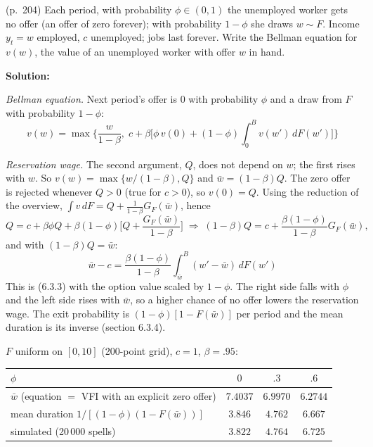\documentclass[12pt, letterpaper]{article}
\newcommand{\wb}{\bar w}
\begin{document}
\begin{tcolorbox}[oddbox,title={Exercise 6.1 \quad Being Unemployed with a Chance of an Offer}]
\begin{tcolorbox}[questionbox]
(p.~204) Each period, with probability $\phi\in(0,1)$ the unemployed worker gets no offer (an offer of
zero forever); with probability $1-\phi$ she draws $w\sim F$. Income $y_t=w$ employed, $c$ unemployed; jobs
last forever. Write the Bellman equation for $v(w)$, the value of an unemployed worker with offer $w$ in
hand.
\end{tcolorbox}

\textbf{Solution:}

\emph{Bellman equation.} Next period's offer is $0$ with probability $\phi$ and a draw from $F$ with
probability $1-\phi$:
\[
\boxed{v(w)=\max\Big\{\frac{w}{1-\beta},\;c+\beta\Big[\phi\,v(0)+(1-\phi)\int_0^Bv(w')\,dF(w')\Big]\Big\}}
\]

\emph{Reservation wage.} The second argument, $Q$, does not depend on $w$; the first rises with $w$. So
$v(w)=\max\{w/(1-\beta),Q\}$ and $\wb=(1-\beta)Q$. The zero offer is rejected whenever $Q>0$ (true for
$c>0$), so $v(0)=Q$. Using the reduction of the overview,
$\int v\,dF=Q+\frac{1}{1-\beta}G_F(\wb)$, hence
\[
Q=c+\beta\phi Q+\beta(1-\phi)\Big[Q+\frac{G_F(\wb)}{1-\beta}\Big]
\;\Longrightarrow\;(1-\beta)Q=c+\frac{\beta(1-\phi)}{1-\beta}G_F(\wb),
\]
and with $(1-\beta)Q=\wb$:
\[
\boxed{\wb-c=\frac{\beta(1-\phi)}{1-\beta}\int_{\wb}^B(w'-\wb)\,dF(w')}
\]
This is (6.3.3) with the option value scaled by $1-\phi$. The right side falls with $\phi$ and the left side
rises with $\wb$, so a higher chance of no offer lowers the reservation wage. The exit probability is
$(1-\phi)[1-F(\wb)]$ per period and the mean duration is its inverse (section 6.3.4).

\begin{tcolorbox}[databox]
$F$ uniform on $[0,10]$ (200-point grid), $c=1$, $\beta=.95$:
\begin{center}
\begin{tabular}{@{}lccc@{}}
\toprule
$\phi$ & $0$ & $.3$ & $.6$\\
\midrule
$\wb$ (equation $=$ VFI with an explicit zero offer) & $7.4037$ & $6.9970$ & $6.2744$\\
mean duration $1/[(1-\phi)(1-F(\wb))]$ & $3.846$ & $4.762$ & $6.667$\\
simulated (20\,000 spells) & $3.822$ & $4.764$ & $6.725$\\
\bottomrule
\end{tabular}
\end{center}
\end{tcolorbox}
\end{tcolorbox}
\end{document}

